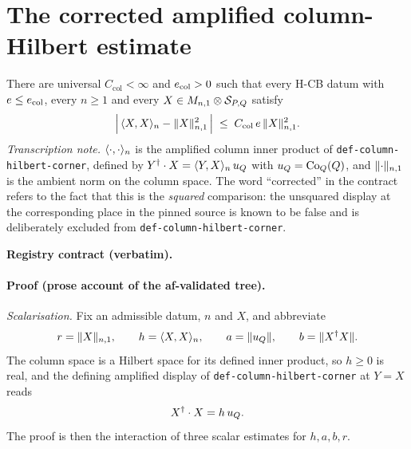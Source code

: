 \section{The corrected amplified column-Hilbert estimate}\label{sec:hcb-column-hilbert-squared}

\begin{lemma}\label{lem:hcb-column-hilbert-squared}
There are universal $C_{\mathrm{col}}<\infty$ and $e_{\mathrm{col}}>0$ such that every
H-CB datum with $e\le e_{\mathrm{col}}$, every $n\ge1$ and every
$X\in M_{n,1}\otimes\mathcal S_{P,Q}$ satisfy
\begin{equation}\label{eq:ch-main}
  \Bigl\lvert\,\langle X,X\rangle_{n}-\lVert X\rVert_{n,1}^{2}\,\Bigr\rvert
  \;\le\;C_{\mathrm{col}}\,e\,\lVert X\rVert_{n,1}^{2}.
\end{equation}
\emph{Transcription note.} $\langle \cdot,\cdot\rangle_{n}$ is the amplified column inner product of
\texttt{def-column-hilbert-corner}, defined by $Y^{\dagger}\mathbin{\cdot} X=\langle Y,X\rangle_{n}\,u_{Q}$ with
$u_{Q}=\mathrm{Co}_{Q}(Q)$, and $\lVert \cdot\rVert_{n,1}$ is the ambient norm on the column space. The
word ``corrected'' in the contract refers to the fact that this is the \emph{squared}
comparison: the unsquared display at the corresponding place in the pinned source is
known to be false and is deliberately excluded from \texttt{def-column-hilbert-corner}.
\end{lemma}

\noindent\textbf{Registry contract (verbatim).}

\paragraph{Proof (prose account of the af-validated tree).}
\emph{Scalarisation.} Fix an admissible datum, $n$ and $X$, and abbreviate
\[
  r=\lVert X\rVert_{n,1},\qquad h=\langle X,X\rangle_{n},\qquad a=\lVert u_{Q}\rVert,\qquad b=\lVert X^{\dagger} X\rVert.
\]
The column space is a Hilbert space for its defined inner product, so $h\ge0$ is real, and
the defining amplified display of \texttt{def-column-hilbert-corner} at $Y=X$ reads
\begin{equation}\label{eq:ch-display}
  X^{\dagger}\mathbin{\cdot} X=h\,u_{Q}.
\end{equation}
The proof is then the interaction of three scalar estimates for $h,a,b,r$.

